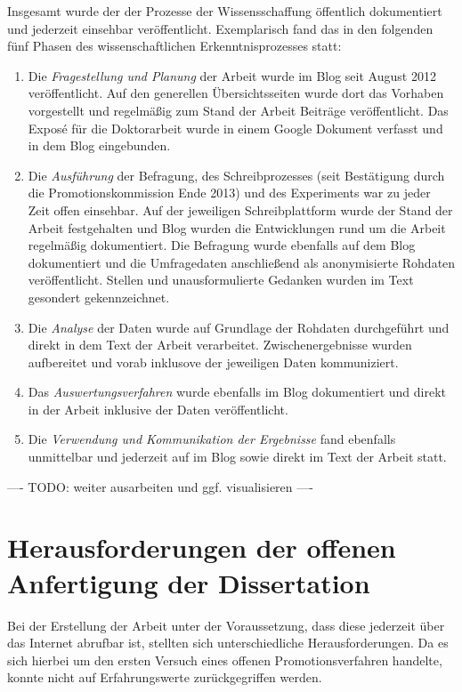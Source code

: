 Insgesamt wurde der der Prozesse der Wissensschaffung öffentlich dokumentiert und jederzeit einsehbar veröffentlicht. Exemplarisch fand das in den folgenden fünf Phasen des wissenschaftlichen Erkenntnisprozesses statt:
\begin{enumerate}
\item Die \textit{Fragestellung und Planung} der Arbeit wurde im Blog seit August 2012 veröffentlicht. Auf den generellen Übersichtsseiten wurde dort das Vorhaben vorgestellt und regelmäßig zum Stand der Arbeit Beiträge veröffentlicht. Das Exposé für die Doktorarbeit wurde in einem Google Dokument verfasst und in dem Blog eingebunden.
\item Die \textit{Ausführung} der Befragung, des Schreibprozesses (seit Bestätigung durch die Promotionskommission Ende 2013) und des Experiments war zu jeder Zeit offen einsehbar. Auf der jeweiligen Schreibplattform wurde der Stand der Arbeit festgehalten und Blog wurden die Entwicklungen rund um die Arbeit regelmäßig dokumentiert. Die Befragung wurde ebenfalls auf dem Blog dokumentiert und die Umfragedaten anschließend als anonymisierte Rohdaten veröffentlicht. Stellen und unausformulierte Gedanken wurden im Text gesondert gekennzeichnet.
\item Die \textit{Analyse} der Daten wurde auf Grundlage der Rohdaten durchgeführt und direkt in dem Text der Arbeit verarbeitet. Zwischenergebnisse wurden aufbereitet und vorab inklusove der jeweiligen Daten kommuniziert.
\item Das \textit{Auswertungsverfahren} wurde ebenfalls im Blog dokumentiert und direkt in der Arbeit inklusive der Daten veröffentlicht.
\item Die \textit{Verwendung und Kommunikation der Ergebnisse} fand ebenfalls unmittelbar und jederzeit auf im Blog sowie direkt im Text der Arbeit statt.
\end{enumerate}

---- TODO: weiter ausarbeiten und ggf. visualisieren ----

\section{Herausforderungen der offenen Anfertigung der Dissertation}

Bei der Erstellung der Arbeit unter der Voraussetzung, dass diese jederzeit über das Internet abrufbar ist, stellten sich unterschiedliche Herausforderungen. Da es sich hierbei um den ersten Versuch eines offenen Promotionsverfahren handelte, konnte nicht auf Erfahrungswerte zurückgegriffen werden.

